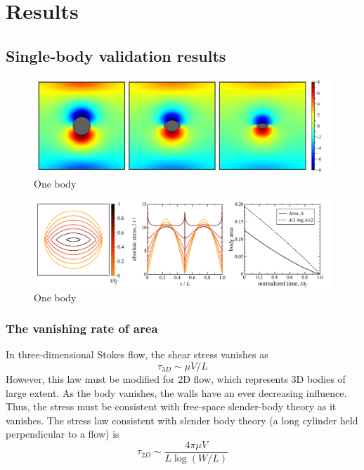 \documentclass[preprint, 10pt]{elsarticle}
\begin{document}
\section{Results\label{s:results}} 

\subsection{Single-body validation results}

\begin{figure}%
\begin{center}
\includegraphics[width = 0.9 \textwidth]{./figs/01bodseq.pdf}
\caption{One body}
\label{}
\end{center}
\end{figure}

\begin{figure}%
\begin{center}
\includegraphics[width = 0.99 \textwidth]{./figs/IntfacesStressArea.pdf}
\caption{One body}
\label{}
\end{center}
\end{figure}

\subsubsection{The vanishing rate of area}
In three-dimensional Stokes flow, the shear stress vanishes as
\begin{equation}
\tau_{3D} \sim \mu V/L
\end{equation}
However, this law must be modified for 2D flow, which represents 3D bodies of large extent. As the body vanishes, the walls have an ever decreasing influence. Thus, the stress must be consistent with free-space slender-body theory as it vanishes. The stress law consistent with slender body theory (a long cylinder held perpendicular to a flow) is
\begin{equation}
\tau_{2D} \sim \frac{4 \pi \mu V}{L \log(W/L)}
\end{equation}
\end{document}
